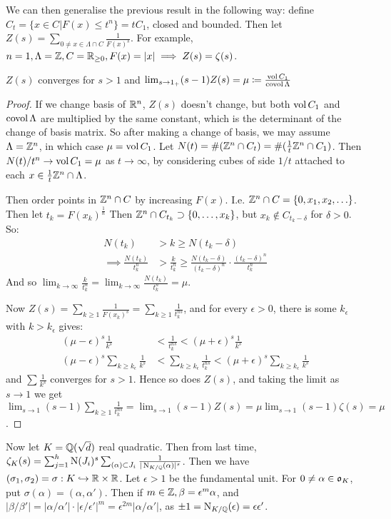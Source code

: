 \documentclass[10pt,a4paper]{article}
\begin{document}
We can then generalise the previous result in the following way: define $C_t = \{x \in C|F(x)\leq t^n\} = tC_1$, closed and bounded. Then let $Z(s) = \sum_{0\neq x \in \Lambda \cap C}\frac{1}{F(x)^s}$. For example, $n=1, \Lambda = \mathbb{Z}, C = \mathbb{R}_{\geq 0}, F(x) = |x| \implies Z(s) = \zeta(s)$.
\begin{theorem}
$Z(s)$ converges for $s>1$ and $\lim_{s \to 1_+} (s-1)Z(s) = \mu \coloneqq \frac{\operatorname{vol} C_1}{\operatorname{covol} \Lambda}$
\end{theorem}
\begin{proof}
If we change basis of $\mathbb{R}^n$, $Z(s)$ doesn't change, but both $\operatorname{vol} C_1$ and $\operatorname{covol} \Lambda$ are multiplied by the same constant, which is the determinant of the change of basis matrix. So after making a change of basis, we may assume $\Lambda = \mathbb{Z}^n$, in which case $\mu = \operatorname{vol} C_1$. Let $N(t) = \#(\mathbb{Z}^n \cap C_t) = \#(\frac{1}{t}\mathbb{Z}^n \cap C_1)$. Then $N(t)/t^n \to \operatorname{vol} C_1 = \mu$ as $t \to \infty$, by considering cubes of side $1/t$ attached to each $x \in \frac{1}{t}\mathbb{Z}^n \cap \Lambda$.

Then order points in $\mathbb{Z}^n \cap C$ by increasing $F(x)$. I.e. $\mathbb{Z}^n \cap C = \{0, x_1, x_2, \ldots\}$. Then let $t_k = F(x_k)^{\frac1n}$ Then $\mathbb{Z}^n \cap C_{t_k} \supset \{0, \ldots, x_k\}$, but $x_k \notin C_{t_k-\delta}$ for $\delta >0$. So:
\begin{align*}
N(t_k) &> k \geq N(t_k-\delta)\\
\implies \frac{N(t_k)}{t_k^n} &> \frac{k}{t_k^n} \geq \frac{N(t_k-\delta)}{(t_k-\delta)^n}\cdot \frac{(t_k-\delta)^n}{t_k^n}
\end{align*}
And so $\lim_{k \to \infty} \frac{k}{t_k^n} = \lim_{k \to \infty} \frac{N(t_k)}{t_k^n} = \mu$.

Now $Z(s) = \sum_{k \geq 1} \frac{1}{F(x_k)^s} = \sum_{k \geq 1} \frac{1}{t_k^{ns}}$, and for every $\epsilon > 0$, there is some $k_\epsilon$ with $k > k_\epsilon$ gives:
\begin{align*}
(\mu-\epsilon)^s\frac{1}{k^s} &< \frac{1}{t_k^{ns}} < (\mu+\epsilon)^s\frac{1}{k^s}\\
(\mu-\epsilon)^s\sum_{k\geq k_\epsilon}\frac{1}{k^s} &< \sum_{k\geq k_\epsilon} \frac{1}{t_k^{ns}} < (\mu+\epsilon)^s \sum_{k\geq k_{\epsilon}}\frac{1}{k^s}
\end{align*}
and $\sum \frac{1}{k^s}$ converges for $s >1$. Hence so does $Z(s)$, and taking the limit as $s \to 1$ we get $\lim_{s \to 1}(s-1)\sum_{k\geq 1}\frac{1}{t_k^{ns}} = \lim_{s\to 1}(s-1)Z(s) = \mu\lim_{s\to 1}(s-1)\zeta(s) = \mu$.
\end{proof}
Now let $K = \mathbb{Q}(\sqrt{d})$ real quadratic. Then from last time, $\zeta_K(s) = \sum_{j=1}^h \operatorname{N}(J_i)^s \sum_{(\alpha)\subset J_i} \frac{1}{|\operatorname{N}_{K/\mathbb{Q}}(\alpha)|^s}$. Then we have $(\sigma_1, \sigma_2) = \sigma:K \hookrightarrow \mathbb{R} \times \mathbb{R}$. Let $\epsilon > 1$ be the fundamental unit. For $0 \neq \alpha \in \mathfrak{o}_K$, put $\sigma(\alpha) = (\alpha, \alpha')$. Then if $m \in \mathbb{Z}, \beta = \epsilon^m \alpha$, and $|\beta/\beta'| = |\alpha/\alpha'|\cdot|\epsilon/\epsilon'|^m = \epsilon^{2m}|\alpha/\alpha'|$, as $\pm 1 = \operatorname{N}_{K/\mathbb{Q}}(\epsilon) = \epsilon\epsilon'$.
\end{document}
